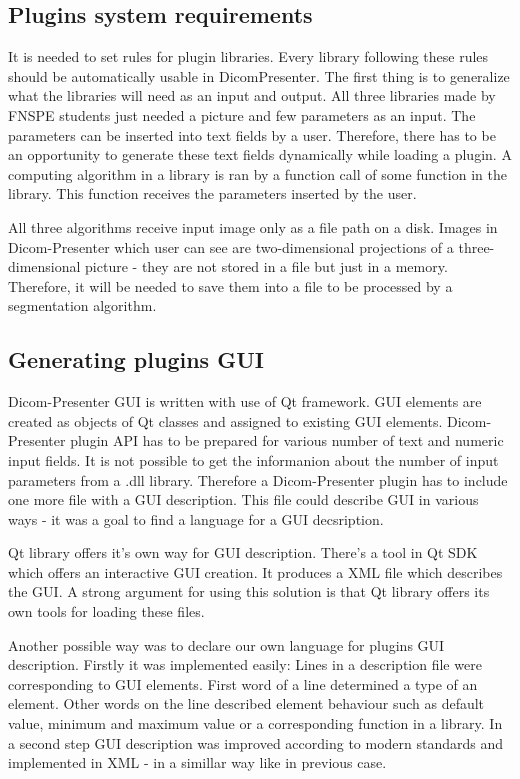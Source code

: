 \subsection*{Plugins system requirements}

It is needed to set rules for plugin libraries. Every library following these rules should be automatically usable in DicomPresenter. The first thing is to generalize what the libraries will need as an input and output. All three libraries made by FNSPE students just needed a picture and few parameters as an input. The parameters can be inserted into text fields by a user. Therefore, there has to be an opportunity to generate these text fields dynamically while loading a plugin. A computing algorithm in a library is ran by a function call of some function in the library. This function receives the parameters inserted by the user.

All three algorithms receive input image only as a file path on a disk. Images in Dicom-Presenter which user can see are two-dimensional projections of a three-dimensional picture - they are not stored in a file but just in a memory. Therefore, it will be needed to save them into a file to be processed by a segmentation algorithm.

\subsection*{Generating plugins GUI}

Dicom-Presenter GUI is written with use of Qt framework. GUI elements are created as objects of Qt classes and assigned to existing GUI elements. Dicom-Presenter plugin API has to be prepared for various number of text and numeric input fields. It is not possible to get the informanion about the number of input parameters from a .dll library. Therefore a Dicom-Presenter plugin has to include one more file with a GUI description. This file could describe GUI in various ways - it was a goal to find a language for a GUI decsription.

Qt library offers it's own way for GUI description. There's a tool in Qt SDK which offers an interactive GUI creation. It produces a XML file which describes the GUI. A strong argument for using this solution is that Qt library offers its own tools for loading these files.

Another possible way was to declare our own language for plugins GUI description. Firstly it was implemented easily: Lines in a description file were corresponding to GUI elements. First word of a line determined a type of an element. Other words on the line described element behaviour such as default value, minimum and maximum value or a corresponding function in a library. In a second step GUI description was improved according to modern standards and implemented in XML - in a simillar way like in previous case.

